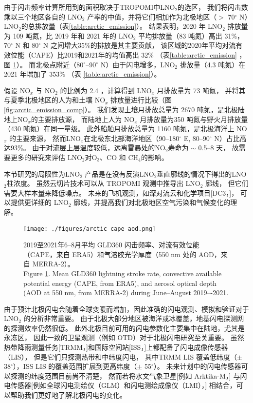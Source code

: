 由于闪击频率计算所用到的面积取决于TROPOMI中LNO$_2$的选区，
我们将闪击数乘以三个地区各自的 LNO$_2$ 产率的中值，并将它们相加作为北极地区（$>$ 70$^{\circ}$ N）LNO$_2$的总排放量（表\ref{table:arctic_emission}）。
结果表明，2020 年 LNO$_2$ 排放量为 109 吨氮，比 2019 年和 2021 年的 LNO$_2$ 平均排放量（83 吨氮）高出 31\%，
70$^{\circ}$ N 和 80$^{\circ}$ N 之间增大35\%的排放是其主要贡献，
该区域的2020年平均对流有效位能（CAPE）比2019和2021年的均值高出 32\%
（表\ref{table:arctic_emission} ，图 \ref{fig:arctic_cape_aod}）。
而北极点附近（80$^{\circ}$--90$^{\circ}$ N）由于闪电增多，LNO$_2$ 排放量（4.3 吨氮）在 2021 年增加了 353\% （表 \ref{table:arctic_emission}）。

假设 NO$_x$ 与 NO$_2$ 的比例为 2.4 \citep{Silvern.2018}，计算得到 LNO$_x$ 月排放量为 73 吨氮，
并将其与夏季北极地区的人为和土壤 NO$_x$ 排放量进行比较（图\ref{fig:arctic_emission_comp}）。
我们发现土壤月排放总量为 2670 吨氮，是北极陆地上NO$_x$的主要排放源，
而陆地上人为 NO$_x$ 月排放量为350 吨氮与野火月排放量（430 吨氮）在同一量级。
此外船舶月排放总量为 1160 吨氮，是北极海洋上 NO$_x$ 的主要来源，
然而LNO$_x$在北极东北部海洋地区（90--180$^{\circ}$ E, 80--90$^{\circ}$ N）占比高达93\%。
由于对流层上层温度较低，远离雷暴处的NO$_2$寿命为 $\sim$ 0.5--8 天\citep{Schumann.2007,Nault.2017}，
故需要更多的研究来评估 LNO$_2$对O$_3$、CO 和 CH$_4$的影响。


本节研究的局限性为LNO$_2$ 产品是在没有反演LNO$_2$垂直廓线的情况下得出的LNO$_2$柱浓度。
虽然云切片技术\citep{BelmonteRivas.2015,Marais.2021}可以从 TROPOMI 观测中推导出 LNO$_2$ 廓线，
但它们需要大样本量来降低噪点。
未来的飞机观测，如深对流云和化学项目[DC3，\citet{Barth.2019}]，
可以提供更详细的 LNO$_2$ 廓线，并提高我们对北极地区空气污染和气候变化的理解\citep{Law.2007,Schmale.2018}。


\begin{figure}[H]
\centering
\texttt{[image: ./figures/arctic\_cape\_aod.png]}
\caption{
2019至2021年6--8月平均 GLD360 闪击频率、对流有效位能（CAPE，来自 ERA5）和气溶胶光学厚度（550 nm 处的 AOD，来自 MERRA-2）。\\
Figure \ref{fig:arctic_cape_aod}.
Mean GLD360 lightning stroke rate, convective available potential energy (CAPE, from ERA5), and aerosol optical depth (AOD at 550 nm, from MERRA-2) during June--August 2019–-2021.
}
\label{fig:arctic_cape_aod}
\end{figure}


由于预计北极闪电会随着全球变暖而增加，因此准确的闪电观测、模拟和验证对于 LNO$_2$ 的分析非常重要。
由于北极大部分地区被海洋或冰覆盖，地基闪电探测网的探测效率仍然很低\citep{Vagasky.2022}。
此外北极目前可用的闪电参数化主要集中在陆地，尤其是永冻区\citep{Chen.2021a}，
因此一致的卫星观测（例如 OTD）对于北极闪电研究至关重要。
虽然热带降雨测量任务[TRMM，\citet{Cecil.2014}]和国际空间站[ISS，\citet{Blakeslee.2020}]上都配备了闪电成像传感器（LIS），
但是它们只探测热带和中纬度闪电，
其中TRMM LIS 覆盖低纬度（$\pm$ 38$^{\circ}$），ISS LIS 的覆盖范围扩展到更高纬度（$\pm$ 55$^{\circ}$）。
未来计划中的闪电传感器可以探测的纬度范围目前尚不清楚，
然而若将水文气象卫星[例如 Arktika-M，\citet{Asmus.2021}]
与闪电传感器[例如全球闪电测绘仪（GLM）和闪电测绘成像仪（LMI），\citet{Goodman.2013,Yang.2017}] 相结合，可以帮助我们更好地了解北极闪电的变化。


